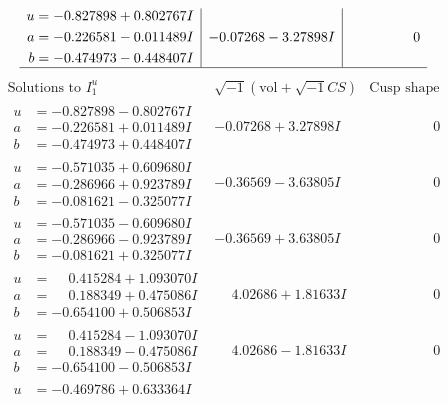 \documentclass[1p]{elsarticle_modified}
\theoremstyle{definition}
\newcommand{\I}{\sqrt{-1}}
\begin{document}
$$\begin{array}{c|c|c}
\begin{aligned}
u &= -0.827898 + 0.802767 I \\
a &= -0.226581 - 0.011489 I \\
b &= -0.474973 - 0.448407 I\end{aligned}
 & -0.07268 - 3.27898 I & \phantom{-0.000000 } 0\\
 \hline 
 \end{array}$$\newpage$$\begin{array}{c|c|c}  
\text{Solutions to }I^u_{1}& \I (\text{vol} + \sqrt{-1}CS) & \text{Cusp shape}\\
 \hline 
\begin{aligned}
u &= -0.827898 - 0.802767 I \\
a &= -0.226581 + 0.011489 I \\
b &= -0.474973 + 0.448407 I\end{aligned}
 & -0.07268 + 3.27898 I & \phantom{-0.000000 } 0 \\ \hline\begin{aligned}
u &= -0.571035 + 0.609680 I \\
a &= -0.286966 + 0.923789 I \\
b &= -0.081621 - 0.325077 I\end{aligned}
 & -0.36569 - 3.63805 I & \phantom{-0.000000 } 0 \\ \hline\begin{aligned}
u &= -0.571035 - 0.609680 I \\
a &= -0.286966 - 0.923789 I \\
b &= -0.081621 + 0.325077 I\end{aligned}
 & -0.36569 + 3.63805 I & \phantom{-0.000000 } 0 \\ \hline\begin{aligned}
u &= \phantom{-}0.415284 + 1.093070 I \\
a &= \phantom{-}0.188349 + 0.475086 I \\
b &= -0.654100 + 0.506853 I\end{aligned}
 & \phantom{-}4.02686 + 1.81633 I & \phantom{-0.000000 } 0 \\ \hline\begin{aligned}
u &= \phantom{-}0.415284 - 1.093070 I \\
a &= \phantom{-}0.188349 - 0.475086 I \\
b &= -0.654100 - 0.506853 I\end{aligned}
 & \phantom{-}4.02686 - 1.81633 I & \phantom{-0.000000 } 0 \\ \hline\begin{aligned}
u &= -0.469786 + 0.633364 I \\

\end{aligned}
\end{array}$$
\end{document}
